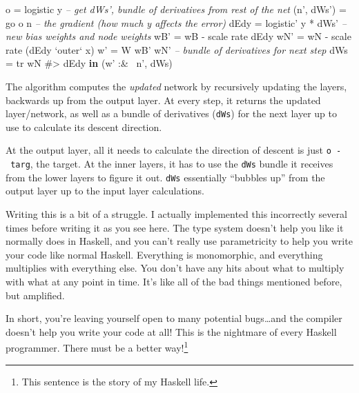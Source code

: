 \documentclass[]{article}
\newenvironment{Shaded}{}{}
\newcommand{\KeywordTok}[1]{\textcolor[rgb]{0.00,0.44,0.13}{\textbf{{#1}}}}
\newcommand{\DataTypeTok}[1]{\textcolor[rgb]{0.56,0.13,0.00}{{#1}}}
\newcommand{\CommentTok}[1]{\textcolor[rgb]{0.38,0.63,0.69}{\textit{{#1}}}}
\newcommand{\OtherTok}[1]{\textcolor[rgb]{0.00,0.44,0.13}{{#1}}}
\newcommand{\FunctionTok}[1]{\textcolor[rgb]{0.02,0.16,0.49}{{#1}}}
\newcommand{\NormalTok}[1]{{#1}}
\begin{document}
\begin{Shaded}
\begin{Highlighting}[]
              \NormalTok{o          }\FunctionTok{=} \NormalTok{logistic y}
              \CommentTok{-- get dWs', bundle of derivatives from rest of the net}
              \NormalTok{(n', dWs') }\FunctionTok{=} \NormalTok{go o n}
              \CommentTok{-- the gradient (how much y affects the error)}
              \NormalTok{dEdy       }\FunctionTok{=} \NormalTok{logistic' y }\FunctionTok{*} \NormalTok{dWs'}
              \CommentTok{-- new bias weights and node weights}
              \NormalTok{wB'  }\FunctionTok{=} \NormalTok{wB }\FunctionTok{-} \NormalTok{scale rate dEdy}
              \NormalTok{wN'  }\FunctionTok{=} \NormalTok{wN }\FunctionTok{-} \NormalTok{scale rate (dEdy }\OtherTok{`outer`} \NormalTok{x)}
              \NormalTok{w'   }\FunctionTok{=} \DataTypeTok{W} \NormalTok{wB' wN'}
              \CommentTok{-- bundle of derivatives for next step}
              \NormalTok{dWs  }\FunctionTok{=} \NormalTok{tr wN }\FunctionTok{#>} \NormalTok{dEdy}
          \KeywordTok{in}  \NormalTok{(w' }\FunctionTok{:&~} \NormalTok{n', dWs)}
\end{Highlighting}
\end{Shaded}

The algorithm computes the \emph{updated} network by recursively
updating the layers, backwards up from the output layer. At every step,
it returns the updated layer/network, as well as a bundle of derivatives
(\texttt{dWs}) for the next layer up to use to calculate its descent
direction.

At the output layer, all it needs to calculate the direction of descent
is just \texttt{o\ -\ targ}, the target. At the inner layers, it has to
use the \texttt{dWs} bundle it receives from the lower layers to figure
it out. \texttt{dWs} essentially ``bubbles up'' from the output layer up
to the input layer calculations.

Writing this is a bit of a struggle. I actually implemented this
incorrectly several times before writing it as you see here. The type
system doesn't help you like it normally does in Haskell, and you can't
really use parametricity to help you write your code like normal
Haskell. Everything is monomorphic, and everything multiplies with
everything else. You don't have any hits about what to multiply with
what at any point in time. It's like all of the bad things mentioned
before, but amplified.

In short, you're leaving yourself open to many potential bugs\ldots{}and
the compiler doesn't help you write your code at all! This is the
nightmare of every Haskell programmer. There must be a better
way!\footnote{This sentence is the story of my Haskell life.}
\end{document}

